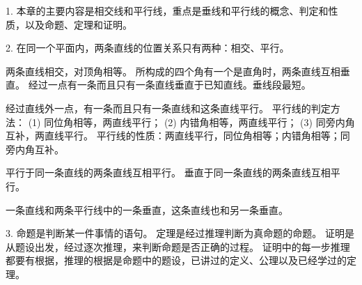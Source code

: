 \xiaojie

1. 本章的主要内容是相交线和平行线，重点是垂线和平行线的概念、判定和性质，以及命题、定理和证明。

2. 在同一个平面内，两条直线的位置关系只有两种：相交、平行。

两条直线相交，对顶角相等。 所构成的四个角有一个是直角时，两条直线互相垂直。
经过一点有一条而且只有一条直线垂直于已知直线。垂线段最短。

经过直线外一点，有一条而且只有一条直线和这条直线平行。
平行线的判定方法：
(1) 同位角相等，两直线平行；
(2) 内错角相等，两直线平行；
(3) 同旁内角互补，两直线平行。
平行线的性质：两直线平行，同位角相等；内错角相等；同旁内角互补。

平行于同一条直线的两条直线互相平行。
垂直于同一条直线的两条直线互相平行。

一条直线和两条平行线中的一条垂直，这条直线也和另一条垂直。

3. 命题是判断某一件事情的语句。
定理是经过推理判断为真命题的命题。
证明是从题设出发，经过逐次推理，来判断命题是否正确的过程。
证明中的每一步推理都要有根据，推理的根据是命题中的题设，已讲过的定义、公理以及已经学过的定理。

